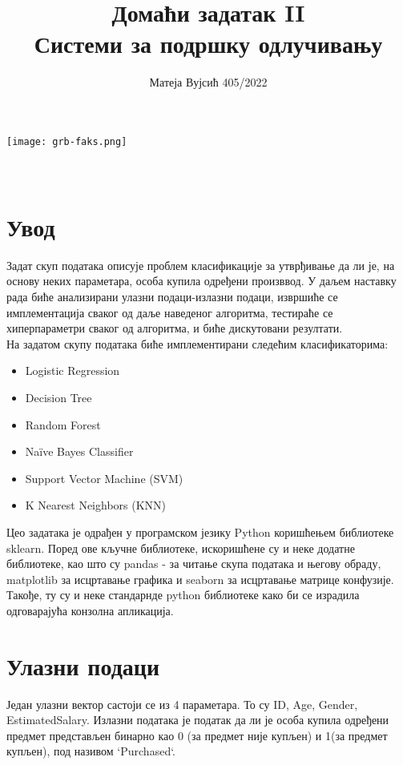 \documentclass[11pt]{article} %
\title{Домаћи задатак II \\  Системи за подршку одлучивању}
\author{Матеја Вујсић 405/2022}
\begin{document}
\makeatletter
    \begin{titlepage}
        \begin{center}
            \texttt{[image: grb-faks.png]}\\[7ex]
            {\huge \bfseries  \@title }\\[2ex] 
            {\LARGE  \@author}\\[50ex] 
            {\large \@date}
        \end{center}
    \end{titlepage}
\makeatother
\thispagestyle{empty}
\newpage
\newpage

\doublespacing
\tableofcontents
\singlespacing

\newpage
\section{Увод}
Задат скуп података описује проблем класификације за утврђивање да ли је, на основу неких параметара, особа купила одређени произввод. У даљем наставку рада биће анализирани улазни подаци-излазни подаци, извршиће се имплементација сваког од даље наведеног алгоритма, тестираће се хиперпараметри сваког од алгоритма, и биће дискутовани резултати. \\
На задатом скупу података биће имплементирани следећим класификаторима:
\begin{itemize}
	\item Logistic Regression
	\item Decision Tree
	\item Random Forest
	\item Naïve Bayes Classifier
	\item Support Vector Machine (SVM)
	\item K Nearest Neighbors (KNN)
\end{itemize}

Цео задатака је одрађен у програмском језику Python коришћењем библиотеке sklearn. Поред ове кључне библиотеке, искоришћене су и неке додатне библиотеке, као што су pandas - за читање скупа података и његову обраду, matplotlib за исцртавање графика и seaborn за исцртавање матрице конфузије. Такође, ту су и неке стандарнде python библиотеке како би се израдила одговарајућа конзолна апликација.

\newpage

\section{Улазни подаци}
Један улазни вектор састоји се из 4 параметара. То су ID, Age, Gender,
 EstimatedSalary. 
Излазни података је податак да ли је особа купила одређени предмет представљен бинарно као 0 (за предмет није купљен) и 1(за предмет купљен), под називом  `Purchased`.
\end{document}
